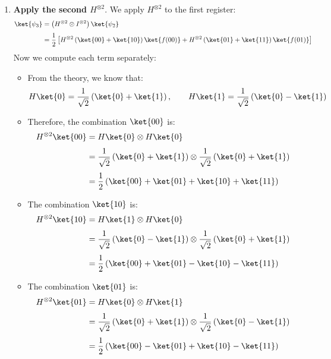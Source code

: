 \begin{enumerate}[label={\textbf{Step \arabic*.}}, leftmargin=2cm]
    \item \textbf{Apply the second $H^{\otimes 2}$}. We apply $H^{\otimes 2}$ to the first register:
        \begin{align*}
            \ket{\psi_3} &= \left(H^{\otimes 2} \otimes I^{\otimes 2}\right) \ket{\psi_2} \\[.3em]
            &= \frac{1}{2} \left[
                H^{\otimes 2} \left(\ket{00} + \ket{10}\right) \ket{f(00)} +
                H^{\otimes 2} \left(\ket{01} + \ket{11}\right) \ket{f(01)}
            \right]
        \end{align*}
        Now we compute each term separately:
        \begin{itemize}
            \item From the theory, we know that:
                \begin{equation*}
                    H\ket{0} = \frac{1}{\sqrt{2}} \left(\ket{0} + \ket{1}\right), \qquad H\ket{1} = \frac{1}{\sqrt{2}} \left(\ket{0} - \ket{1}\right)
                \end{equation*}

            \item Therefore, the combination $\ket{00}$ is:
                \begin{align*}
                    H^{\otimes 2} \ket{00} &= H\ket{0} \otimes H\ket{0} \\[.3em]
                    &= \frac{1}{\sqrt{2}} \left(\ket{0} + \ket{1}\right) \otimes \frac{1}{\sqrt{2}} \left(\ket{0} + \ket{1}\right) \\[.3em]
                    &= \frac{1}{2} \left(\ket{00} + \ket{01} + \ket{10} + \ket{11}\right)
                \end{align*}

            \item The combination $\ket{10}$ is:
                \begin{align*}
                    H^{\otimes 2} \ket{10} &= H\ket{1} \otimes H\ket{0} \\[.3em]
                    &= \frac{1}{\sqrt{2}} \left(\ket{0} - \ket{1}\right) \otimes \frac{1}{\sqrt{2}} \left(\ket{0} + \ket{1}\right) \\[.3em]
                    &= \frac{1}{2} \left(\ket{00} + \ket{01} - \ket{10} - \ket{11}\right)
                \end{align*}

            \item The combination $\ket{01}$ is:
                \begin{align*}
                    H^{\otimes 2} \ket{01} &= H\ket{0} \otimes H\ket{1} \\[.3em]
                    &= \frac{1}{\sqrt{2}} \left(\ket{0} + \ket{1}\right) \otimes \frac{1}{\sqrt{2}} \left(\ket{0} - \ket{1}\right) \\[.3em]
                    &= \frac{1}{2} \left(\ket{00} - \ket{01} + \ket{10} - \ket{11}\right)
                \end{align*}


\end{itemize}
\end{enumerate}
